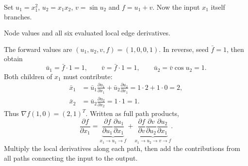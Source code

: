 Set $u_1=x_1^2$, $u_2=x_1x_2$, $v=\sin u_2$ and $f=u_1+v$. Now the input $x_1$ itself branches.
\begin{center}

\small Node values and all six evaluated local edge derivatives.
\end{center}
The forward values are $(u_1,u_2,v,f)=(1,0,0,1)$. In reverse, seed $\bar f=1$, then obtain
\[
 \bar u_1=\bar f\cdot1=1,\qquad
 \bar v=\bar f\cdot1=1,\qquad
 \bar u_2=\bar v\cos u_2=1.
\]
Both children of $x_1$ must contribute:
\begin{align*}
 \bar x_1
 &=\bar u_1\frac{\partial u_1}{\partial x_1}
  +\bar u_2\frac{\partial u_2}{\partial x_1}
  =1\cdot2+1\cdot0=2,\\
 \bar x_2&=\bar u_2\frac{\partial u_2}{\partial x_2}=1\cdot1=1.
\end{align*}
Thus $\boxed{\nabla f(1,0)=(2,1)^T}$. Written as full path products,
\[
 \frac{\partial f}{\partial x_1}
 =\underbrace{\frac{\partial f}{\partial u_1}
   \frac{\partial u_1}{\partial x_1}}_{x_1\to u_1\to f}
 +\underbrace{\frac{\partial f}{\partial v}
   \frac{\partial v}{\partial u_2}
   \frac{\partial u_2}{\partial x_1}}_{x_1\to u_2\to v\to f}.
\]
Multiply the local derivatives along each path, then add the contributions from all paths connecting the input to the output.

